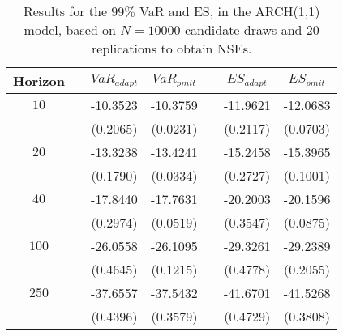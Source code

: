 \begin{table}[h] 
\centering 
\caption{Results for the $99\%$ VaR and ES, in the ARCH(1,1) model, based on $N=10000$ candidate draws and $20$ replications to obtain NSEs.} 
\label{tab:res_pmit_arch} 
\begin{tabular}{ccccccc}  
 Horizon & & $VaR_{adapt}$ & $VaR_{pmit}$ & & $ES_{adapt}$ & $ES_{pmit}$ \\ \hline 
$10$ & & -10.3523 & -10.3759 & & -11.9621 & -12.0683  \\ 
 & & (0.2065) & (0.0231) & & (0.2117) & (0.0703)   \\ [1ex] 
$20$ & & -13.3238 & -13.4241 & & -15.2458 & -15.3965  \\ 
 & & (0.1790) & (0.0334) & & (0.2727) & (0.1001)   \\ [1ex] 
$40$ & & -17.8440 & -17.7631 & & -20.2003 & -20.1596  \\ 
 & & (0.2974) & (0.0519) & & (0.3547) & (0.0875)   \\ [1ex] 
$100$ & & -26.0558 & -26.1095 & & -29.3261 & -29.2389  \\ 
 & & (0.4645) & (0.1215) & & (0.4778) & (0.2055)   \\ [1ex] 
$250$ & & -37.6557 & -37.5432 & & -41.6701 & -41.5268  \\ 
 & & (0.4396) & (0.3579) & & (0.4729) & (0.3808)   \\ [1ex] 
\hline 
\end{tabular} 
\end{table} 
